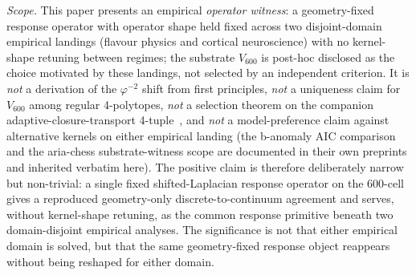 \documentclass[11pt]{article}
\newcommand{\Ph}{\varphi}
\newcommand{\Rsixhundred}{V_{600}}
\begin{document}
\noindent\emph{Scope.}
This paper presents an empirical \emph{operator witness}: a
geometry-fixed response operator with operator shape held fixed
across two disjoint-domain empirical landings (flavour physics
and cortical neuroscience) with no kernel-shape retuning between
regimes; the substrate $\Rsixhundred$ is post-hoc disclosed as
the choice motivated by these landings, not selected by an
independent criterion. It is \emph{not} a derivation of the
$\Ph^{-2}$ shift from first principles, \emph{not} a uniqueness
claim for $\Rsixhundred$ among regular 4-polytopes, \emph{not} a
selection theorem on the companion adaptive-closure-transport
4-tuple~\citep{SmartAdaptiveClosureTransport2026}, and \emph{not}
a model-preference claim against alternative kernels on either
empirical landing (the b-anomaly AIC comparison and the aria-chess
substrate-witness scope are documented in their own preprints and
inherited verbatim here).
The positive claim is therefore deliberately narrow but
non-trivial: a single fixed shifted-Laplacian response operator on
the 600-cell gives a reproduced geometry-only discrete-to-continuum
agreement and serves, without kernel-shape retuning, as the
common response primitive beneath two domain-disjoint empirical
analyses. The significance is not that either empirical domain is
solved, but that the same geometry-fixed response object reappears
without being reshaped for either domain.
\end{document}
